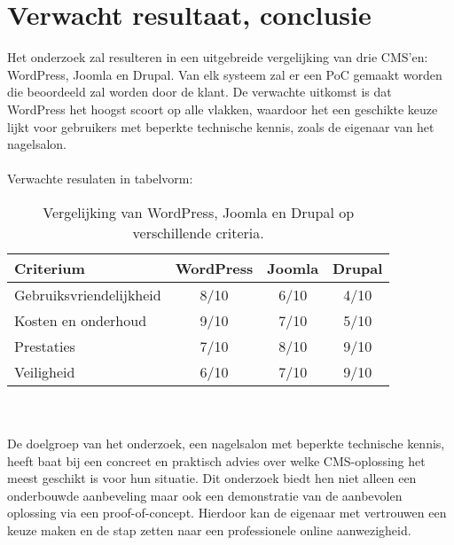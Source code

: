 \section{Verwacht resultaat, conclusie}%
\label{sec:verwachte_resultaten}

\noindent
Het onderzoek zal resulteren in een uitgebreide vergelijking van drie CMS'en: WordPress, Joomla en Drupal. Van elk systeem zal er een PoC gemaakt worden die beoordeeld zal worden door de klant. De verwachte uitkomst is dat WordPress het hoogst scoort op alle vlakken, waardoor het een geschikte keuze lijkt voor gebruikers met beperkte technische kennis, zoals de eigenaar van het nagelsalon.
\\ \\
Verwachte resulaten in tabelvorm:
\begin{table}[h!]
    \centering
    \begin{tabular}{lccc}
        \toprule
        Criterium            & WordPress & Joomla & Drupal \\
        \midrule
        Gebruiksvriendelijkheid & 8/10      & 6/10   & 4/10   \\
        Kosten en onderhoud   & 9/10      & 7/10   & 5/10   \\
        Prestaties            & 7/10      & 8/10   & 9/10   \\
        Veiligheid            & 6/10      & 7/10   & 9/10   \\
        \bottomrule
    \end{tabular}
    \caption{Vergelijking van WordPress, Joomla en Drupal op verschillende criteria.}
    \label{tab:cms-comparison}
\end{table}
\\ \\ 
De doelgroep van het onderzoek, een nagelsalon met beperkte technische kennis, heeft baat bij een concreet en praktisch advies over welke CMS-oplossing het meest geschikt is voor hun situatie. Dit onderzoek biedt hen niet alleen een onderbouwde aanbeveling maar ook een demonstratie van de aanbevolen oplossing via een proof-of-concept. Hierdoor kan de eigenaar met vertrouwen een keuze maken en de stap zetten naar een professionele online aanwezigheid.